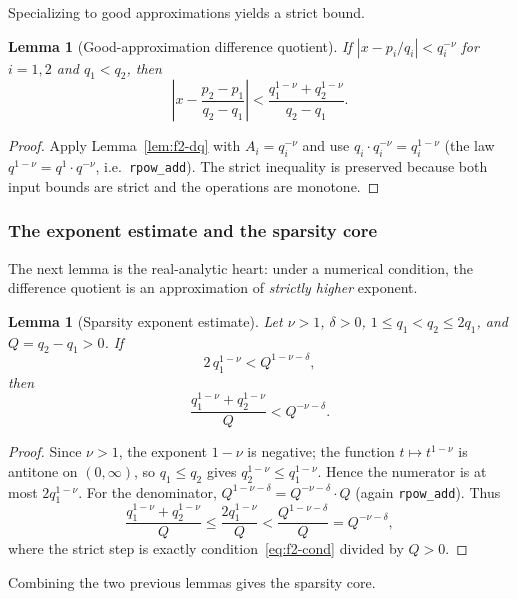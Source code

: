 \documentclass[11pt]{amsart}
\newtheorem{lemma}[theorem]{Lemma}
\theoremstyle{definition}
\theoremstyle{remark}
\numberwithin{equation}{section}
\begin{document}
Specializing to good approximations yields a strict bound.

\begin{lemma}[Good-approximation difference quotient]\label{lem:f2-good-dq}
If $|x-p_i/q_i|<q_i^{-\nu}$ for $i=1,2$ and $q_1<q_2$, then
\[
\left|x-\frac{p_2-p_1}{q_2-q_1}\right|<\frac{q_1^{1-\nu}+q_2^{1-\nu}}{q_2-q_1}.
\]
\end{lemma}
\begin{proof}
Apply Lemma~\ref{lem:f2-dq} with $A_i=q_i^{-\nu}$ and use $q_i\cdot q_i^{-\nu}=q_i^{1-\nu}$ (the law $q^{1-\nu}=q^1\cdot q^{-\nu}$, i.e.\ \texttt{rpow\_add}). The strict inequality is preserved because both input bounds are strict and the operations are monotone.
\end{proof}

\subsubsection{The exponent estimate and the sparsity core}

The next lemma is the real-analytic heart: under a numerical condition, the difference quotient is an approximation of \emph{strictly higher} exponent.

\begin{lemma}[Sparsity exponent estimate]\label{lem:f2-exp}
Let $\nu>1$, $\delta>0$, $1\le q_1<q_2\le2q_1$, and $Q=q_2-q_1>0$. If
\begin{equation}\label{eq:f2-cond}
2\,q_1^{1-\nu}<Q^{1-\nu-\delta},
\end{equation}
then
\[
\frac{q_1^{1-\nu}+q_2^{1-\nu}}{Q}<Q^{-\nu-\delta}.
\]
\end{lemma}
\begin{proof}
Since $\nu>1$, the exponent $1-\nu$ is negative; the function $t\mapsto t^{1-\nu}$ is antitone on $(0,\infty)$, so $q_1\le q_2$ gives $q_2^{1-\nu}\le q_1^{1-\nu}$. Hence the numerator is at most $2q_1^{1-\nu}$. For the denominator, $Q^{1-\nu-\delta}=Q^{-\nu-\delta}\cdot Q$ (again \texttt{rpow\_add}). Thus
\[
\frac{q_1^{1-\nu}+q_2^{1-\nu}}{Q}\le\frac{2q_1^{1-\nu}}{Q}<\frac{Q^{1-\nu-\delta}}{Q}=Q^{-\nu-\delta},
\]
where the strict step is exactly condition~\eqref{eq:f2-cond} divided by $Q>0$.
\end{proof}

Combining the two previous lemmas gives the sparsity core.
\end{document}
